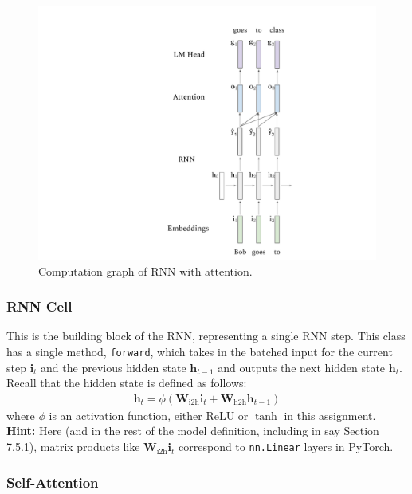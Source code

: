 \documentclass[11pt,addpoints,answers]{exam}
\newcommand{\hv}{\mathbf{h}}
\newcommand{\iv}{\mathbf{i}}
\newcommand{\Wv}{\mathbf{W}}
\begin{document}
\begin{figure}[htp]
    \centering
    \includegraphics[scale=0.5]{figs/rnn_diagram.pdf}
    \caption{Computation graph of RNN with attention.}
    \label{fig:enter-label}
\end{figure}

\subsubsection{RNN Cell}

This is the building block of the RNN, representing a single RNN step. This class has a single method, \texttt{forward}, which takes in the batched input for the current step $\iv_t$ and the previous hidden state $\hv_{t-1}$ and outputs the next hidden state $\hv_t$. Recall that the hidden state is defined as follows:
\begin{align*}
    \hv_t = \phi( \Wv_\text{i2h} \iv_t + \Wv_\text{h2h} \hv_{t-1} )
\end{align*}
where $\phi$ is an activation function, either ReLU or $\tanh$ in this assignment.
\textbf{Hint:} Here (and in the rest of the model definition, including in say Section 7.5.1), matrix products like $\Wv_\text{i2h} \iv_t$ correspond to \texttt{nn.Linear} layers in PyTorch.

\subsubsection{Self-Attention}
\end{document}
